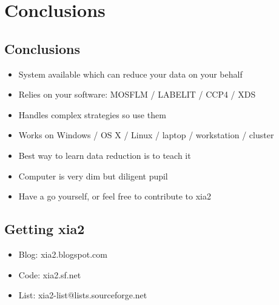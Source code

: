 \documentclass[a4paper, 11pt]{article}
\begin{document}
\section{Conclusions}

\subsection{Conclusions}
\begin{itemize}
\item{System available which can reduce your data on your behalf}
\item{Relies on your software: MOSFLM / LABELIT / CCP4 / XDS}
\item{Handles complex strategies so use them}
\item{Works on Windows / OS X / Linux / laptop / workstation / cluster}
\item{Best way to learn data reduction is to teach it}
\item{Computer is very dim but diligent pupil}
\item{Have a go yourself, or feel free to contribute to xia2}
\end{itemize}

\subsection{Getting xia2}
\begin{itemize}
\item{Blog: xia2.blogspot.com}
\item{Code: xia2.sf.net}
\item{List: xia2-list@lists.sourceforge.net}
\end{itemize}
\end{document}
